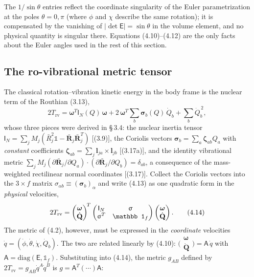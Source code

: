The $1/\sin\theta$ entries reflect the coordinate singularity of the Euler parametrization at the poles $\theta=0,\pi$ (where $\phi$ and $\chi$ describe the same rotation); it is compensated by the vanishing of $|\det\mathsf E|=\sin\theta$ in the volume element, and no physical quantity is singular there. Equations (4.10)--(4.12) are the only facts about the Euler angles used in the rest of this section.

\subsection{The ro-vibrational metric tensor}

The classical rotation--vibration kinetic energy in the body frame is the nuclear term of the Routhian (3.13),
\begin{equation}
2T_{\mathrm{rv}}
=\boldsymbol\omega^{T}\mathsf I_N(Q)\,\boldsymbol\omega
+2\,\boldsymbol\omega^{T}\!\sum_b\boldsymbol\sigma_b(Q)\,\dot Q_b
+\sum_b\dot Q_b^{\,2}, \tag{4.13}
\end{equation}
whose three pieces were derived in \S\,3.4: the nuclear inertia tensor $\mathsf I_N=\sum_jM_j(\bar R_j^2\mathbb 1-\bar{\mathbf R}_j\bar{\mathbf R}_j^{T})$ [(3.9)], the Coriolis vectors $\boldsymbol\sigma_b=\sum_a\boldsymbol\zeta_{ab}Q_a$ with \emph{constant} coefficients $\boldsymbol\zeta_{ab}=\sum_j\mathbf l_{ja}\times\mathbf l_{jb}$ [(3.17a)], and the identity vibrational metric $\sum_jM_j(\partial\bar{\mathbf R}_j/\partial Q_a)\!\cdot\!(\partial\bar{\mathbf R}_j/\partial Q_b)=\delta_{ab}$, a consequence of the mass-weighted rectilinear normal coordinates [(3.17)]. Collect the Coriolis vectors into the $3\times f$ matrix $\sigma_{\alpha b}\equiv(\boldsymbol\sigma_b)_\alpha$ and write (4.13) as one quadratic form in the \emph{physical} velocities,
\begin{equation}
2T_{\mathrm{rv}}=\begin{pmatrix}\boldsymbol\omega\\ \dot{\mathbf Q}\end{pmatrix}^{\!T}
\begin{pmatrix}\mathsf I_N & \Msig\\ \Msig^{T} & \mathbb 1_f\end{pmatrix}
\begin{pmatrix}\boldsymbol\omega\\ \dot{\mathbf Q}\end{pmatrix}. \tag{4.14}
\end{equation}
The metric of (4.2), however, must be expressed in the \emph{coordinate} velocities $\dot q=(\dot\phi,\dot\theta,\dot\chi,\dot Q_b)$. The two are related linearly by (4.10): $\bigl(\begin{smallmatrix}\boldsymbol\omega\\ \dot{\mathbf Q}\end{smallmatrix}\bigr)=\mathsf A\,\dot q$ with $\mathsf A=\mathrm{diag}(\mathsf E,\mathbb 1_f)$. Substituting into (4.14), the metric $g_{AB}$ defined by $2T_{\mathrm{rv}}=g_{AB}\dot q^A\dot q^B$ is $g=\mathsf A^{T}(\cdots)\mathsf A$:
